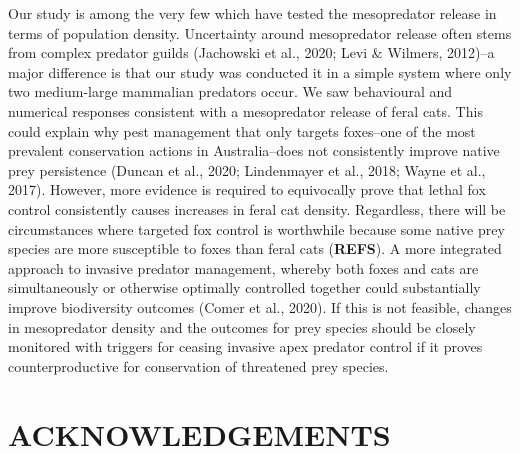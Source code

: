\documentclass[]{elsarticle} %
\begin{document}
Our study is among the very few which have tested the mesopredator release in terms of population density. Uncertainty around mesopredator release often stems from complex predator guilds (Jachowski et al., 2020; Levi \& Wilmers, 2012)--a major difference is that our study was conducted it in a simple system where only two medium-large mammalian predators occur. We saw behavioural and numerical responses consistent with a mesopredator release of feral cats. This could explain why pest management that only targets foxes--one of the most prevalent conservation actions in Australia--does not consistently improve native prey persistence (Duncan et al., 2020; Lindenmayer et al., 2018; Wayne et al., 2017). However, more evidence is required to equivocally prove that lethal fox control consistently causes increases in feral cat density. Regardless, there will be circumstances where targeted fox control is worthwhile because some native prey species are more susceptible to foxes than feral cats (\textbf{REFS}). A more integrated approach to invasive predator management, whereby both foxes and cats are simultaneously or otherwise optimally controlled together could substantially improve biodiversity outcomes (Comer et al., 2020). If this is not feasible, changes in mesopredator density and the outcomes for prey species should be closely monitored with triggers for ceasing invasive apex predator control if it proves counterproductive for conservation of threatened prey species.

\newpage

\hypertarget{acknowledgements}{%
\section{ACKNOWLEDGEMENTS}\label{acknowledgements}}
\end{document}
